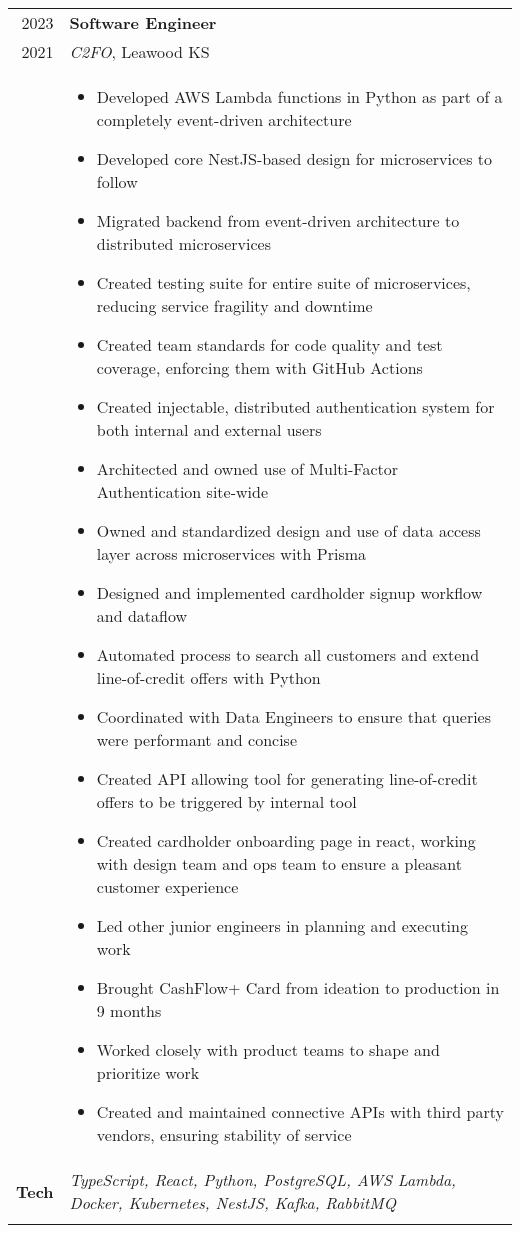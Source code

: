 \documentclass[a4paper,10pt]{article}
\newcommand{\br}{\\\multicolumn{2}{c}{}}
\begin{document}
\begin{tabular}{r|p{15cm}}
  \textsc{2023} & \textbf{Software Engineer} \\
  \textsc{2021} & \textit{C2FO}, Leawood KS
  \\ &  
       \begin{itemize}
       \item Developed AWS Lambda functions in Python as part of a completely event-driven architecture
       \item Developed core NestJS-based design for microservices to follow
       \item Migrated backend from event-driven architecture to distributed microservices
       \item Created testing suite for entire suite of microservices, reducing service fragility and downtime
       \item Created team standards for code quality and test coverage, enforcing them with GitHub Actions
       \item Created injectable, distributed authentication system for both internal and external users
       \item Architected and owned use of Multi-Factor Authentication site-wide
       \item Owned and standardized design and use of data access layer across microservices with Prisma
       \item Designed and implemented cardholder signup workflow and dataflow
       \item Automated process to search all customers and extend line-of-credit offers with Python
       \item Coordinated with Data Engineers to ensure that queries were performant and concise
       \item Created API allowing tool for generating line-of-credit offers to be triggered by internal tool
       \item Created cardholder onboarding page in react, working with design team and ops team to ensure a pleasant customer experience
       \item Led other junior engineers in planning and executing work
       \item Brought CashFlow+ Card from ideation to production in 9 months
       \item Worked closely with product teams to shape and prioritize work
       \item Created and maintained connective APIs with third party vendors, ensuring stability of service
       \end{itemize} \\
  \textbf{Tech} & \textit{TypeScript, React, Python, PostgreSQL, AWS Lambda, Docker, Kubernetes, NestJS, Kafka, RabbitMQ} \br \\
\end{tabular}
\end{document}
